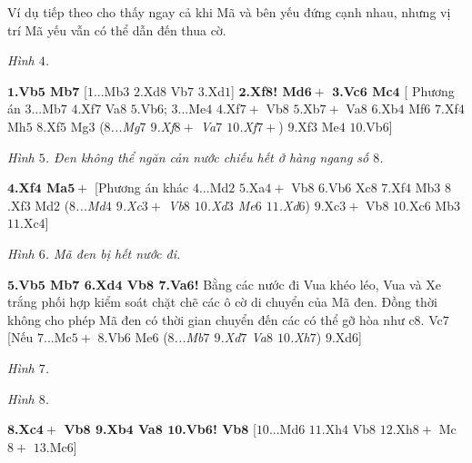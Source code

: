 \begin{multicols}{2}
	\vskip 0.1cm
	Ví dụ tiếp theo cho thấy ngay cả khi Mã và bên yếu đứng cạnh nhau, nhưng vị trí Mã yếu vẫn có thể dẫn đến thua cờ. 
	\begin{center}
		\newgame
		\scalebox{0.85}\showboard
		\vskip 0.2cm
		\textit{\small\color{gocco}Hình $4$.}
	\end{center}
	\textbf{\color{gocco}$\pmb{1}$.Vb$\pmb{5}$ Mb$\pmb{7}$} [$1$...Mb$3$ $2$.Xd$8$ Vb$7$ $3$.Xd$1$]
	\vskip 0.1cm
	\textbf{\color{gocco}$\pmb{2}$.Xf$\pmb{8}$! Md$\pmb{6+}$ $\pmb{3}$.Vc$\pmb{6}$ Mc$\pmb{4}$} [ Phương án $3$...Mb$7$ $4$.Xf$7$ Va$8$ $5$.Vb$6$; $3$...Me$4$ $4$.Xf$7+$ Vb$8$ $5$.Xb$7+$ Va$8$ $6$.Xb$4$ Mf$6$ $7$.Xf$4$ Mh$5$ $8$.Xf$5$ Mg$3$ (\textit{$8$...Mg$7$ $9$.Xf$8+$ Va$7$ $10$.Xf$7+$}) $9$.Xf$3$ Me$4$ $10$.Vb$6$]
	\begin{center}
		\newgame
		\scalebox{0.85}\showboard
		\vskip 0.2cm
		\textit{\small\color{gocco}Hình $5$. Đen không thể ngăn cản nước chiếu hết ở hàng ngang số $8$.}
	\end{center}
	\textbf{\color{gocco}$\pmb{4}$.Xf$\pmb{4}$ Ma$\pmb{5+}$} [Phương án khác $4$...Md$2$ $5$.Xa$4+$ Vb$8$ $6$.Vb$6$ Xc$8$ $7$.Xf$4$ Mb$3$ $8$.Xf$3$ Md$2$ (\textit{$8$...Md$4$ $9$.Xc$3+$ Vb$8$ $10$.Xd$3$ Me$6$ $11$.Xd$6$}) $9$.Xc$3+$ Vb$8$ $10$.Xc$6$ Mb$3$ $11$.Xc$4$]
	\begin{center}
		\newgame
		\scalebox{0.85}\showboard
		\vskip 0.2cm
		\textit{\small\color{gocco}Hình $6$. Mã đen bị hết nước đi.}
	\end{center}
	\textbf{\color{gocco}$\pmb{5}$.Vb$\pmb{5}$ Mb$\pmb{7}$ $\pmb{6}$.Xd$\pmb{4}$ Vb$\pmb{8}$ $\pmb{7}$.Va$\pmb{6}$!} Bằng các nước đi Vua khéo léo, Vua và Xe trắng phối hợp kiểm soát chặt chẽ các ô cờ di chuyển của Mã đen. Đồng thời không cho phép Mã đen có thời gian chuyển đến các có thể gỡ hòa như c$8$. Vc$7$ [Nếu $7$...Mc$5+$ $8$.Vb$6$ Me$6$ (\textit{$8$...Mb$7$ $9$.Xd$7$ Va$8$ $10$.Xh$7$}) $9$.Xd$6$]
	\begin{center}
		\newgame
		\scalebox{0.85}\showboard
		\vskip 0.2cm
		\textit{\small\color{gocco}Hình $7$.}
	\end{center}
	\begin{center}
		\newgame
		\scalebox{0.85}\showboard
		\vskip 0.2cm
		\textit{\small\color{gocco}Hình $8$.}
	\end{center}
	\textbf{\color{gocco}$\pmb{8}$.Xc$\pmb{4+}$ Vb$\pmb{8}$ $\pmb{9}$.Xb$\pmb{4}$ Va$\pmb{8}$ $\pmb{10}$.Vb$\pmb{6}$! Vb$\pmb{8}$} [$10$...Md$6$ $11$.Xh$4$ Vb$8$ $12$.Xh$8+$ Mc$8+$ $13$.Mc$6$]

\end{multicols}
